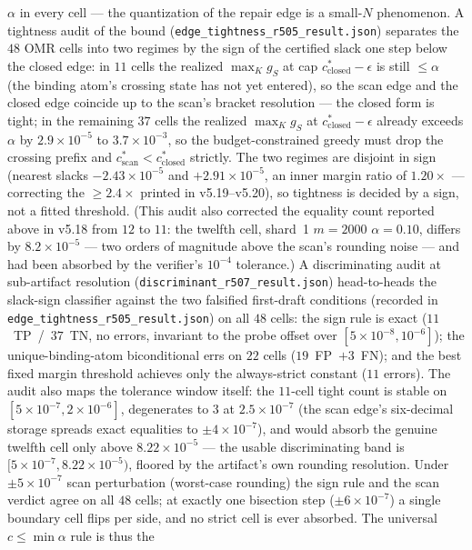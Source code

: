 \documentclass{article}
\theoremstyle{definition}
\theoremstyle{remark}
\begin{document}
$\alpha$ in every cell --- the quantization of the repair edge is a
small-$N$ phenomenon. A tightness audit of the bound
(\texttt{edge\_tightness\_r505\_result.json}) separates the $48$ OMR
cells into two regimes by the sign of the certified slack one step below
the closed edge: in $11$ cells the realized $\max_K g_S$ at cap
$c^*_{\mathrm{closed}}{-}\epsilon$ is still ${\le}\alpha$ (the
binding atom's crossing state has not yet entered), so the scan edge and
the closed edge coincide up to the scan's bracket resolution --- the
closed form is tight; in the remaining $37$ cells the realized $\max_K
g_S$ at $c^*_{\mathrm{closed}}{-}\epsilon$ already exceeds $\alpha$
by $2.9\times10^{-5}$ to $3.7\times10^{-3}$, so the
budget-constrained greedy must drop the crossing prefix and
$c^*_{\mathrm{scan}}<c^*_{\mathrm{closed}}$ strictly. The two regimes
are disjoint in sign (nearest slacks $-2.43\times10^{-5}$ and
$+2.91\times10^{-5}$, an inner margin ratio of $1.20\times$ ---
correcting the ${\ge}2.4\times$ printed in v5.19--v5.20), so tightness
is decided by a sign, not a fitted threshold. (This audit also corrected
the equality count reported above in v5.18 from $12$ to $11$: the
twelfth cell, shard~1 $m{=}2000$ $\alpha{=}0.10$, differs by
$8.2\times10^{-5}$ --- two orders of magnitude above the scan's
rounding noise --- and had been absorbed by the verifier's $10^{-4}$
tolerance.) A discriminating audit at sub-artifact resolution
(\texttt{discriminant\_r507\_result.json}) head-to-heads the slack-sign
classifier against the two falsified first-draft conditions (recorded
in \texttt{edge\_tightness\_r505\_result.json}) on all $48$ cells: the
sign rule is exact
($11$~TP~/~$37$~TN, no errors, invariant to the probe offset over
$[5\times10^{-8},10^{-6}]$); the unique-binding-atom biconditional errs
on $22$ cells ($19$~FP~$+3$~FN); and the best fixed margin threshold
achieves only the always-strict constant ($11$ errors). The audit also
maps the tolerance window itself: the $11$-cell tight count is stable on
$[5\times10^{-7},2\times10^{-6}]$, degenerates to $3$ at
$2.5\times10^{-7}$ (the scan edge's six-decimal storage spreads exact
equalities to $\pm4\times10^{-7}$), and would absorb the genuine twelfth
cell only above $8.22\times10^{-5}$ --- the usable discriminating band
is $[5\times10^{-7},8.22\times10^{-5})$, floored by the artifact's own
rounding resolution. Under $\pm5\times10^{-7}$ scan perturbation
(worst-case rounding) the sign rule and the scan verdict agree on all
$48$ cells; at exactly one bisection step ($\pm6\times10^{-7}$) a single
boundary cell flips per side, and no strict cell is ever absorbed. The universal $c\le\min\alpha$ rule is thus the
\end{document}
